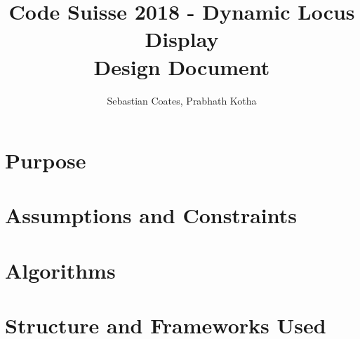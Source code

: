 \documentclass{article}
\title{\textbf{Code Suisse 2018 - Dynamic Locus Display \\ Design Document}}
\author{Sebastian Coates, Prabhath Kotha}
\begin{document}
 
\maketitle{} 
\setlength{\parindent}{0pt}


\clearpage

\section*{Purpose}

\clearpage
\section*{Assumptions and Constraints}

\clearpage
\section*{Algorithms}

\clearpage
\section*{Structure and Frameworks Used}



\end{document}

